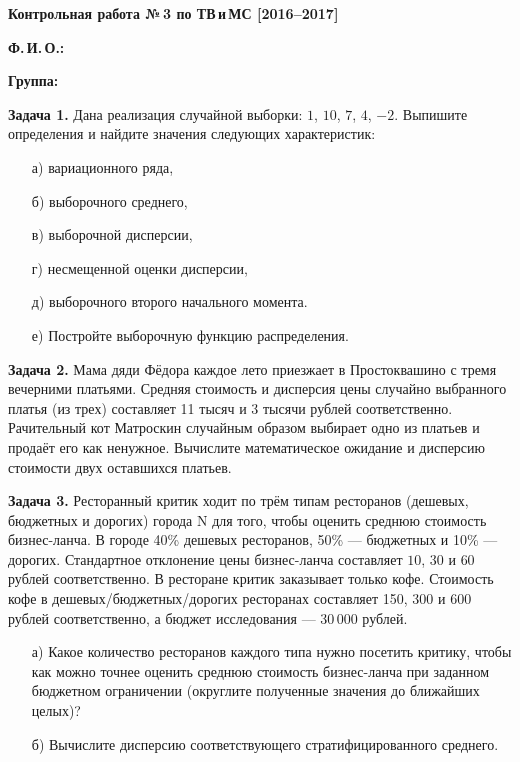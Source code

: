 \documentclass[a4paper, 12pt]{article}
\begin{document}
\begin{center}
    \textbf{\textbf{\large Контрольная работа №\,3 по ТВ\,и\,МС [2016--2017]}}
\end{center}


\textbf{Ф.\,И.\,О.:}

\textbf{Группа:}

\medskip
\textbf{Задача 1.} Дана реализация случайной выборки: $1$, $10$, $7$, $4$, $-2$. Выпишите определения и найдите значения следующих характеристик:
\begin{itemize}
  \item[а)] вариационного ряда,
  \item[б)] выборочного среднего,
  \item[в)] выборочной дисперсии,
  \item[г)] несмещенной оценки дисперсии,
  \item[д)] выборочного второго начального момента.
  \item[е)] Постройте выборочную функцию распределения.
\end{itemize}


\medskip

\textbf{Задача 2.}
Мама дяди Фёдора каждое лето приезжает в Простоквашино с тремя вечерними платьями. Средняя стоимость и дисперсия цены случайно выбранного платья (из трех) составляет 11 тысяч и 3 тысячи рублей соответственно. Рачительный кот Матроскин случайным образом выбирает одно из платьев и продаёт его как ненужное. Вычислите математическое ожидание и дисперсию стоимости двух оставшихся платьев.

\medskip

\textbf{Задача 3.}
Ресторанный критик ходит по трём типам ресторанов (дешевых, бюджетных и дорогих) города N для того, чтобы оценить среднюю стоимость бизнес-ланча. В городе 40\%
дешевых ресторанов, 50\% — бюджетных и 10\% — дорогих. Стандартное отклонение цены бизнес-ланча составляет $10$, $30$ и $60$ рублей соответственно. В ресторане критик заказывает только кофе. Стоимость кофе в дешевых/бюджетных/дорогих ресторанах составляет 150, 300 и 600 рублей соответственно, а бюджет исследования --- 30\,000 рублей.
\begin{itemize}
  \item[а)] Какое количество ресторанов каждого типа нужно посетить критику, чтобы как можно точнее оценить среднюю стоимость бизнес-ланча при заданном бюджетном ограничении (округлите полученные значения до ближайших целых)?
  \item[б)] Вычислите дисперсию соответствующего стратифицированного среднего.
\end{itemize}
\end{document}
